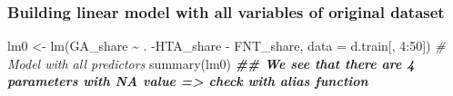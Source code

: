 \documentclass[
]{article}
\newenvironment{Shaded}{\begin{snugshade}}{\end{snugshade}}
\newcommand{\AttributeTok}[1]{\textcolor[rgb]{0.77,0.63,0.00}{#1}}
\newcommand{\CommentTok}[1]{\textcolor[rgb]{0.56,0.35,0.01}{\textit{#1}}}
\newcommand{\DecValTok}[1]{\textcolor[rgb]{0.00,0.00,0.81}{#1}}
\newcommand{\DocumentationTok}[1]{\textcolor[rgb]{0.56,0.35,0.01}{\textbf{\textit{#1}}}}
\newcommand{\FunctionTok}[1]{\textcolor[rgb]{0.00,0.00,0.00}{#1}}
\newcommand{\NormalTok}[1]{#1}
\newcommand{\OtherTok}[1]{\textcolor[rgb]{0.56,0.35,0.01}{#1}}
\newcommand{\SpecialCharTok}[1]{\textcolor[rgb]{0.00,0.00,0.00}{#1}}
\begin{document}
\hypertarget{building-linear-model-with-all-variables-of-original-dataset}{%
\subsubsection{Building linear model with all variables of original
dataset}\label{building-linear-model-with-all-variables-of-original-dataset}}

\begin{Shaded}
\begin{Highlighting}[]
\NormalTok{lm0 }\OtherTok{\textless{}{-}} \FunctionTok{lm}\NormalTok{(GA\_share }\SpecialCharTok{\textasciitilde{}}\NormalTok{ . }\SpecialCharTok{{-}}\NormalTok{HTA\_share }\SpecialCharTok{{-}}\NormalTok{ FNT\_share, }\AttributeTok{data =}\NormalTok{ d.train[, }\DecValTok{4}\SpecialCharTok{:}\DecValTok{50}\NormalTok{]) }\CommentTok{\# Model with all predictors}
\FunctionTok{summary}\NormalTok{(lm0) }\DocumentationTok{\#\# We see that there are 4 parameters with NA value =\textgreater{} check with alias function}
\end{Highlighting}
\end{Shaded}
\end{document}
